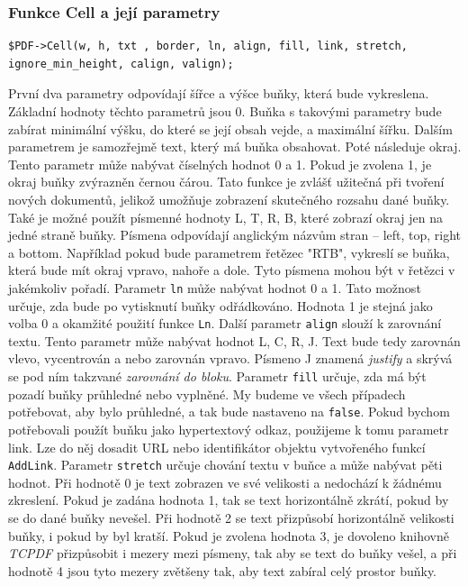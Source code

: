 \documentclass[czech,BP]{thesiskiv}
\begin{document}
\subsubsection{Funkce Cell a její parametry}
\begin{lstlisting}
$PDF->Cell(w, h, txt , border, ln, align, fill, link, stretch, ignore_min_height, calign, valign);
\end{lstlisting}
První dva parametry odpovídají šířce a výšce buňky, která bude vykreslena. Základní hodnoty těchto parametrů jsou 0. Buňka s takovými parametry bude zabírat minimální výšku, do které se její obsah vejde, a maximální šířku. 
Dalším parametrem je samozřejmě text, který má buňka obsahovat. 
Poté následuje okraj. Tento parametr může nabývat číselných hodnot 0 a 1. Pokud je zvolena 1, je okraj buňky zvýrazněn černou čárou. Tato funkce je zvlášť užitečná při tvoření nových dokumentů, jelikož umožňuje zobrazení skutečného rozsahu dané buňky. Také je možné použít písmenné hodnoty L, T, R, B, které zobrazí okraj jen na jedné straně buňky. Písmena odpovídají anglickým názvům stran -- left, top, right a bottom. Například pokud bude parametrem řetězec "RTB", vykreslí se buňka, která bude mít okraj vpravo, nahoře a dole. Tyto písmena mohou být v řetězci v jakémkoliv pořadí.
Parametr \texttt{ln} může nabývat hodnot 0 a 1. Tato možnost určuje, zda bude po vytisknutí buňky odřádkováno. Hodnota 1 je stejná jako volba 0 a okamžité použití funkce \texttt{Ln}. 
Další parametr \texttt{align} slouží k zarovnání textu. Tento parametr může nabývat hodnot L, C, R, J. Text bude tedy zarovnán vlevo, vycentrován a nebo zarovnán vpravo. Písmeno J znamená \emph{justify} a skrývá se pod ním takzvané \emph{zarovnání do bloku}. 
Parametr \texttt{fill} určuje, zda má být pozadí buňky průhledné nebo vyplněné. My budeme ve všech případech potřebovat, aby bylo průhledné, a tak bude nastaveno na \texttt{false}.
Pokud bychom potřebovali použít buňku jako hypertextový odkaz, použijeme k tomu parametr link. Lze do něj dosadit URL nebo identifikátor objektu vytvořeného funkcí \texttt{AddLink}.
Parametr \texttt{stretch} určuje chování textu v buňce a může nabývat pěti hodnot. Při hodnotě 0 je text zobrazen ve své velikosti a nedochází k žádnému zkreslení. Pokud je zadána hodnota 1, tak se text horizontálně zkrátí, pokud by se do dané buňky nevešel. Při hodnotě 2 se text přizpůsobí horizontálně velikosti buňky, i pokud by byl kratší. Pokud je zvolena hodnota 3, je dovoleno knihovně \emph{TCPDF} přizpůsobit i mezery mezi písmeny, tak aby se text do buňky vešel, a při hodnotě 4 jsou tyto mezery zvětšeny tak, aby text zabíral celý prostor buňky. 
\end{document}
